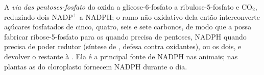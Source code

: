 \begin{definition}\label{def:b1:biosyntheses-integration:ppp}
A \emph{via das pentoses-fosfato} do  oxida a glicose-6-fosfato a
ribulose-5-fosfato e $\mathrm{CO_2}$, reduzindo dois $\mathrm{NADP^+}$ a
NADPH; o ramo não oxidativo dela então interconverte açúcares fosfatados
de cinco, quatro, seis e sete carbonos, de modo que a  possa
fabricar ribose-5-fosfato para os  quando precisa de
pentoses, NADPH quando precisa de poder redutor (síntese de ,
defesa contra oxidantes), ou os dois, e devolver o restante à .
Ela é a principal fonte de NADPH nas  animais; nas plantas as
 do cloroplasto fornecem NADPH durante o dia.
\end{definition}

